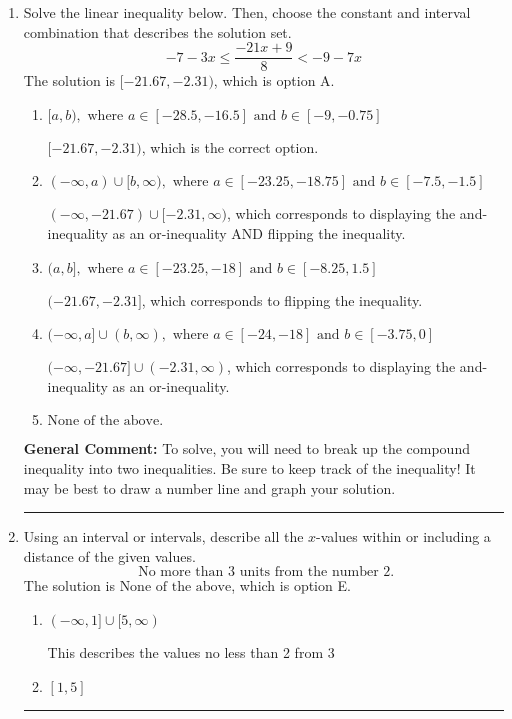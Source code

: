 \documentclass{extbook}[14pt]
\newcommand{\litem}[1]{\item #1

\rule{\textwidth}{0.4pt}}
\begin{document}
\begin{enumerate}
{\begin{enumerate}[label=\Alph*.]
You likely thought the values in the interval were not correct.
\end{enumerate}

\textbf{General Comment:} When thinking about this language, it helps to draw a number line and try points.
}
\litem{
Solve the linear inequality below. Then, choose the constant and interval combination that describes the solution set.
\[ -7 - 3 x \leq \frac{-21 x + 9}{8} < -9 - 7 x \]The solution is \( [-21.67, -2.31) \), which is option A.\begin{enumerate}[label=\Alph*.]
\item \( [a, b), \text{ where } a \in [-28.5, -16.5] \text{ and } b \in [-9, -0.75] \)

$[-21.67, -2.31)$, which is the correct option.
\item \( (-\infty, a) \cup [b, \infty), \text{ where } a \in [-23.25, -18.75] \text{ and } b \in [-7.5, -1.5] \)

$(-\infty, -21.67) \cup [-2.31, \infty)$, which corresponds to displaying the and-inequality as an or-inequality AND flipping the inequality.
\item \( (a, b], \text{ where } a \in [-23.25, -18] \text{ and } b \in [-8.25, 1.5] \)

$(-21.67, -2.31]$, which corresponds to flipping the inequality.
\item \( (-\infty, a] \cup (b, \infty), \text{ where } a \in [-24, -18] \text{ and } b \in [-3.75, 0] \)

$(-\infty, -21.67] \cup (-2.31, \infty)$, which corresponds to displaying the and-inequality as an or-inequality.
\item \( \text{None of the above.} \)


\end{enumerate}

\textbf{General Comment:} To solve, you will need to break up the compound inequality into two inequalities. Be sure to keep track of the inequality! It may be best to draw a number line and graph your solution.
}
\litem{
Using an interval or intervals, describe all the $x$-values within or including a distance of the given values.
\[ \text{ No more than } 3 \text{ units from the number } 2. \]The solution is \( \text{None of the above} \), which is option E.\begin{enumerate}[label=\Alph*.]
\item \( (-\infty, 1] \cup [5, \infty) \)

This describes the values no less than 2 from 3
\item \( [1, 5] \)


\end{enumerate}}
\end{enumerate}
\end{document}
